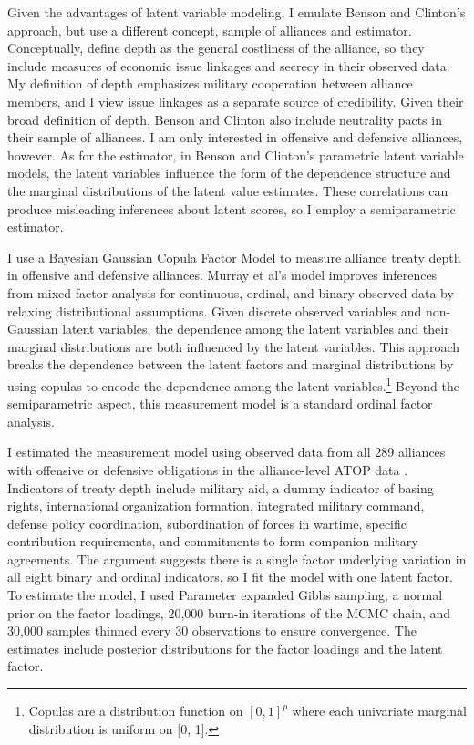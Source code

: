 \documentclass[12pt]{article}
\begin{document}
Given the advantages of latent variable modeling, I emulate Benson and Clinton's approach, but use a different concept, sample of alliances and estimator. 
Conceptually, \citet{BensonClinton2016} define depth as the general costliness of the alliance, so they include measures of economic issue linkages and secrecy in their observed data.
My definition of depth emphasizes military cooperation between alliance members, and I view issue linkages as a separate source of credibility. 
Given their broad definition of depth, Benson and Clinton also include neutrality pacts in their sample of alliances.
I am only interested in offensive and defensive alliances, however.  
As for the estimator, in Benson and Clinton's parametric latent variable models, the latent variables influence the form of the dependence structure and the marginal distributions of the latent value estimates. 
These correlations can produce misleading inferences about latent scores, so I employ a semiparametric estimator.
 

I use a Bayesian Gaussian Copula Factor Model \citep{Murrayetal2013} to measure alliance treaty depth in offensive and defensive alliances. 
Murray et al's model improves inferences from mixed factor analysis for continuous, ordinal, and binary observed data by relaxing distributional assumptions.
Given discrete observed variables and non-Gaussian latent variables, the dependence among the latent variables and their marginal distributions are both influenced by the latent variables.
This approach breaks the dependence between the latent factors and marginal distributions by using copulas to encode the dependence among the latent variables.\footnote{Copulas are a distribution function on $[0, 1]^p$ where each univariate marginal distribution is uniform on [0, 1].}
Beyond the semiparametric aspect, this measurement model is a standard ordinal factor analysis.


I estimated the measurement model using observed data from all 289 alliances with offensive or defensive obligations in the alliance-level ATOP data \citep{Leedsetal2002}. 
Indicators of treaty depth include military aid, a dummy indicator of basing rights, international organization formation, integrated military command, defense policy coordination, subordination of forces in wartime, specific contribution requirements, and commitments to form companion military agreements.
The argument suggests there is a single factor underlying variation in all eight binary and ordinal indicators, so I fit the model with one latent factor. 
To estimate the model, I used Parameter expanded Gibbs sampling, a normal prior on the factor loadings, 20,000 burn-in iterations of the MCMC chain, and 30,000 samples thinned every 30 observations to ensure convergence. 
The estimates include posterior distributions for the factor loadings and the latent factor. 
\end{document}
